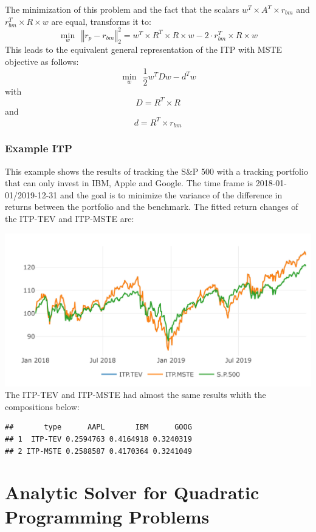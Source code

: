 \documentclass[
  oneside]{book}
\begin{document}
The minimization of this problem and the fact that the scalars \(w^T \times A^T \times r_{bm}\) and \(r_{bm}^T \times R \times w\) are equal, transforms it to:
\[
  \min\limits_{w} \ \  \left\Vert r_{p}-r_{bm} \right\Vert_2^2 
  = w^T \times R^T \times R \times w - 2\cdot r_{bm}^T \times R \times w
\]
This leads to the equivalent general representation of the ITP with MSTE objective as follows:
\[
  \min\limits_{w} \ \ \frac{1}{2} w^T D w - d^T w
\]
with
\[
D = R^T \times R
\]
and
\[
  d = R^T \times r_{bm}
\]

\hypertarget{example-itp}{%
\subsection{Example ITP}\label{example-itp}}

This example shows the results of tracking the S\&P 500 with a tracking portfolio that can only invest in IBM, Apple and Google. The time frame is 2018-01-01/2019-12-31 and the goal is to minimize the variance of the difference in returns between the portfolio and the benchmark. The fitted return changes of the ITP-TEV and ITP-MSTE are:

\includegraphics{Master_Thesis_files/figure-latex/ITP_ex-1.png}
The ITP-TEV and ITP-MSTE had almost the same results whith the compositions below:

\begin{verbatim}
##       type      AAPL       IBM      GOOG
## 1  ITP-TEV 0.2594763 0.4164918 0.3240319
## 2 ITP-MSTE 0.2588587 0.4170364 0.3241049
\end{verbatim}

\hypertarget{analytic-solver-for-quadratic-programming-problems}{%
\chapter{Analytic Solver for Quadratic Programming Problems}\label{analytic-solver-for-quadratic-programming-problems}}
\end{document}
